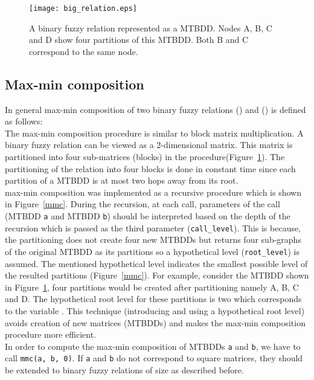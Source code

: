 \documentclass[4pt]{article}
\begin{document}
\begin{figure}
\begin{center}
\texttt{[image: big\_relation.eps]}
\end{center}
\caption{A binary fuzzy relation represented as a MTBDD. Nodes A, B, C and D show four partitions of this MTBDD. Both B and C correspond to the same node.}
\label{big_relation}
\end{figure}

\subsection{Max-min composition}
\label{max_min_composition}
In general max-min composition of two binary fuzzy relations  () and  () is defined as follows:\\
 

The max-min composition procedure is similar to block matrix multiplication. A binary fuzzy relation can be viewed as a 2-dimensional matrix. This matrix is partitioned into four sub-matrices (blocks) in the procedure(Figure~\ref{big_relation}). The partitioning of the relation into four blocks is done in constant time since each partition of a MTBDD is at most two hops away from its root.\\
max-min composition was implemented as a recursive procedure which is shown in Figure~\ref{mmc}. During the recursion, at each call, parameters of the call (MTBDD \verb=a= and MTBDD \verb=b=) should be interpreted based on the depth of the recursion which is passed as the third parameter (\verb=call_level=). This is because, the partitioning does not create four new MTBDDs but returns four sub-graphs of the original MTBDD as its partitions so a hypothetical level (\verb=root_level=) is assumed. The mentioned hypothetical level indicates the smallest possible level of the resulted partitions (Figure~\ref{mmc}). For example, consider the MTBDD shown in Figure~\ref{big_relation}, four partitions would be created after partitioning namely A, B, C and D. The hypothetical root level for these partitions is two which corresponds to the variable . This technique (introducing and using a hypothetical root level) avoids creation of new matrices (MTBDDs) and makes the max-min composition procedure more efficient.\\
In order to compute the max-min composition of MTBDDs \verb=a= and \verb=b=, we have to call \verb=mmc(a, b, 0)=. If \verb=a= and \verb=b= do not correspond to square matrices, they should be extended to binary fuzzy relations of size  as described before.
\end{document}
